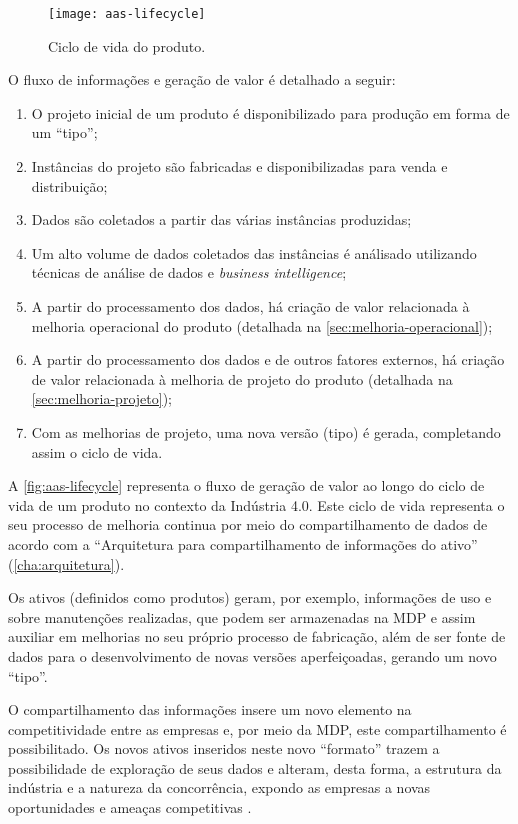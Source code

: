 \begin{figure}[htb!]
	\centering
	\texttt{[image: aas-lifecycle]}
	\caption{Ciclo de vida do produto.}
	\label{fig:aas-lifecycle}
\end{figure}

O fluxo de informações e geração de valor é detalhado a seguir:

\begin{enumerate}[label=(\alph*)]
	\item O projeto inicial de um produto é disponibilizado para produção em forma de um ``tipo'';
	\item Instâncias do projeto são fabricadas e disponibilizadas para venda e distribuição;
	\item Dados são coletados a partir das várias instâncias produzidas;
	\item Um alto volume de dados coletados das instâncias é análisado utilizando técnicas de análise de dados e \textit{business intelligence};
	\item A partir do processamento dos dados, há criação de valor relacionada à melhoria operacional do produto (detalhada na \autoref{sec:melhoria-operacional});
	\item A partir do processamento dos dados e de outros fatores externos, há criação de valor relacionada à melhoria de projeto do produto (detalhada na \autoref{sec:melhoria-projeto});
	\item Com as melhorias de projeto, uma nova versão (tipo) é gerada, completando assim o ciclo de vida.
\end{enumerate}

A \autoref{fig:aas-lifecycle} representa o fluxo de geração de valor ao longo do ciclo de vida de um produto no contexto da Indústria 4.0. Este ciclo de vida representa o seu processo de melhoria continua por meio do compartilhamento de dados de acordo com a ``Arquitetura para compartilhamento de informações do ativo'' (\autoref{cha:arquitetura}).

Os ativos (definidos como produtos) geram, por exemplo, informações de uso e sobre manutenções realizadas, que podem ser armazenadas na MDP e assim auxiliar em melhorias no seu próprio processo de fabricação, além de ser fonte de dados para o desenvolvimento de novas versões aperfeiçoadas, gerando um novo ``tipo''.

O compartilhamento das informações insere um novo elemento na competitividade entre as empresas \cite{framling2013plm} e, por meio da MDP, este compartilhamento é possibilitado. Os novos ativos inseridos neste novo ``formato'' trazem a possibilidade de exploração de seus dados e alteram, desta forma, a estrutura da indústria e a natureza da concorrência, expondo as empresas a novas oportunidades e ameaças competitivas \cite{porter2014smartproducts}.

